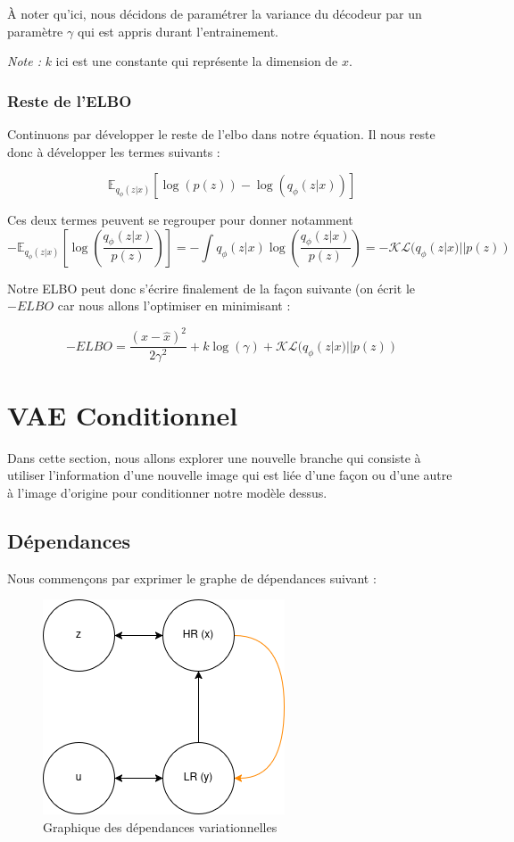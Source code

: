 \documentclass{article}
\begin{document}
À noter qu'ici, nous décidons de paramétrer la variance du décodeur par un paramètre $\gamma$ qui est appris durant l'entrainement.

\emph{Note :} $k$ ici est une constante qui représente la dimension de $x$.

\subsubsection{Reste de l'ELBO}\label{kl}

Continuons par développer le reste de l'elbo dans notre équation.
Il nous reste donc à développer les termes suivants : 

\begin{equation*}
    \mathbb{E}_{q_\phi(z|x)}[\log(p(z)) - \log(q_\phi(z|x))]
\end{equation*}

Ces deux termes peuvent se regrouper pour donner notamment 
\begin{equation*}
    - \mathbb{E}_{q_\phi(z|x)}\left[\log\left(\frac{q_\phi(z|x)}{p(z)}\right)\right] = - \int q_\phi(z|x)\log\left(\frac{q_\phi(z|x)}{p(z)}\right) = - \mathcal{KL}(q_\phi(z|x)||p(z))
\end{equation*}

Notre ELBO peut donc s'écrire finalement de la façon suivante (on écrit le $-ELBO$ car nous allons l'optimiser en minimisant :

\begin{equation}
    - ELBO = \frac{(x-\hat{x})^2}{2\gamma^2} + k\log(\gamma) + \mathcal{KL}(q_\phi(z|x)||p(z))
\end{equation}

\section{VAE Conditionnel}\label{srvae}

Dans cette section, nous allons explorer une nouvelle branche qui consiste à utiliser l'information d'une nouvelle image qui est liée d'une façon ou d'une autre à l'image d'origine pour conditionner notre modèle dessus.
\subsection{Dépendances}
Nous commençons par exprimer le graphe de dépendances suivant :
\begin{figure}[!ht]
    \centering
    \includegraphics[width=0.5\linewidth]{img/SRVAE_deps.png}
    \caption{Graphique des dépendances variationnelles}
    \label{fig:vardeps}
\end{figure}
\end{document}
